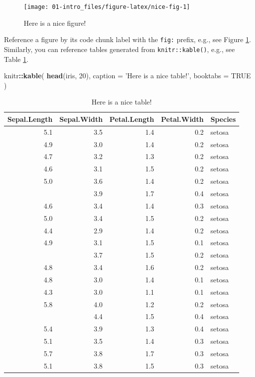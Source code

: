 \documentclass[
]{book}
\newenvironment{Shaded}{\begin{snugshade}}{\end{snugshade}}
\newcommand{\DataTypeTok}[1]{\textcolor[rgb]{0.13,0.29,0.53}{#1}}
\newcommand{\DecValTok}[1]{\textcolor[rgb]{0.00,0.00,0.81}{#1}}
\newcommand{\KeywordTok}[1]{\textcolor[rgb]{0.13,0.29,0.53}{\textbf{#1}}}
\newcommand{\NormalTok}[1]{#1}
\newcommand{\OperatorTok}[1]{\textcolor[rgb]{0.81,0.36,0.00}{\textbf{#1}}}
\newcommand{\OtherTok}[1]{\textcolor[rgb]{0.56,0.35,0.01}{#1}}
\newcommand{\StringTok}[1]{\textcolor[rgb]{0.31,0.60,0.02}{#1}}
\begin{document}
\begin{figure}

{\centering \texttt{[image: 01-intro\_files/figure-latex/nice-fig-1]} 

}

\caption{Here is a nice figure!}\label{fig:nice-fig}
\end{figure}

Reference a figure by its code chunk label with the \texttt{fig:} prefix, e.g., see Figure \ref{fig:nice-fig}. Similarly, you can reference tables generated from \texttt{knitr::kable()}, e.g., see Table \ref{tab:nice-tab}.

\begin{Shaded}
\begin{Highlighting}[]
\NormalTok{knitr}\OperatorTok{::}\KeywordTok{kable}\NormalTok{(}
  \KeywordTok{head}\NormalTok{(iris, }\DecValTok{20}\NormalTok{), }\DataTypeTok{caption =} \StringTok{'Here is a nice table!'}\NormalTok{,}
  \DataTypeTok{booktabs =} \OtherTok{TRUE}
\NormalTok{)}
\end{Highlighting}
\end{Shaded}

\begin{table}

\caption{\label{tab:nice-tab}Here is a nice table!}
\centering
\begin{tabular}[t]{rrrrl}
\toprule
Sepal.Length & Sepal.Width & Petal.Length & Petal.Width & Species\\
\midrule
5.1 & 3.5 & 1.4 & 0.2 & setosa\\
4.9 & 3.0 & 1.4 & 0.2 & setosa\\
4.7 & 3.2 & 1.3 & 0.2 & setosa\\
4.6 & 3.1 & 1.5 & 0.2 & setosa\\
5.0 & 3.6 & 1.4 & 0.2 & setosa\\
\addlinespace
5.4 & 3.9 & 1.7 & 0.4 & setosa\\
4.6 & 3.4 & 1.4 & 0.3 & setosa\\
5.0 & 3.4 & 1.5 & 0.2 & setosa\\
4.4 & 2.9 & 1.4 & 0.2 & setosa\\
4.9 & 3.1 & 1.5 & 0.1 & setosa\\
\addlinespace
5.4 & 3.7 & 1.5 & 0.2 & setosa\\
4.8 & 3.4 & 1.6 & 0.2 & setosa\\
4.8 & 3.0 & 1.4 & 0.1 & setosa\\
4.3 & 3.0 & 1.1 & 0.1 & setosa\\
5.8 & 4.0 & 1.2 & 0.2 & setosa\\
\addlinespace
5.7 & 4.4 & 1.5 & 0.4 & setosa\\
5.4 & 3.9 & 1.3 & 0.4 & setosa\\
5.1 & 3.5 & 1.4 & 0.3 & setosa\\
5.7 & 3.8 & 1.7 & 0.3 & setosa\\
5.1 & 3.8 & 1.5 & 0.3 & setosa\\
\bottomrule
\end{tabular}
\end{table}
\end{document}
